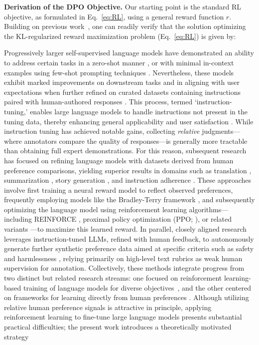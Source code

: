 \textbf{Derivation of the DPO Objective.} Our starting point is the standard RL objective, as formulated in Eq.~\ref{eq:RL}, using a general reward function $r$. Building on previous work~\citep{peters2007reinforcement, peng2019advantage, korbak2022reinforcement, go2023aligning}, one can readily verify that the solution optimizing the KL-regularized reward maximization problem (Eq.~\ref{eq:RL}) is given by:

Progressively larger self-supervised language models have demonstrated an ability to address certain tasks in a zero-shot manner \citep{radford2019language}, or with minimal in-context examples using few-shot prompting techniques \citep{gpt3,megatron,chowdhery2022palm}. Nevertheless, these models exhibit marked improvements on downstream tasks and in aligning with user expectations when further refined on curated datasets containing instructions paired with human-authored responses \citep{mishra-etal-2022-cross,sanh2022multitask,chung2022scaling,thoppilan2022lamda}. This process, termed `instruction-tuning,' enables large language models to handle instructions not present in the tuning data, thereby enhancing general applicability and user satisfaction \citep{chung2022scaling}. While instruction tuning has achieved notable gains, collecting \textit{relative} judgments—where annotators compare the quality of responses—is generally more tractable than obtaining full expert demonstrations. For this reason, subsequent research has focused on refining language models with datasets derived from human preference comparisons, yielding superior results in domains such as translation \citep{kreutzer-etal-2018-reliability}, summarization \citep{stiennon2022learning,ziegler2020finetuning}, story generation \citep{ziegler2020finetuning}, and instruction adherence \citep{ouyang2022training,ramamurthy2023is}. These approaches involve first training a neural reward model to reflect observed preferences, frequently employing models like the Bradley-Terry framework \citep{bradley1952rankanalysis}, and subsequently optimizing the language model using reinforcement learning algorithms—including REINFORCE \citep{williams1992reinforce}, proximal policy optimization (PPO; \cite{schulman2017proximal}), or related variants \citep{ramamurthy2023is}—to maximize this learned reward. In parallel, closely aligned research leverages instruction-tuned LLMs, refined with human feedback, to autonomously generate further synthetic preference data aimed at specific criteria such as safety and harmlessness \citep{bai2022constitutional}, relying primarily on high-level text rubrics as weak human supervision for annotation. Collectively, these methods integrate progress from two distinct but related research streams: one focused on reinforcement learning-based training of language models for diverse objectives~\citep{Ranzato2015SequenceLT,paulus2018a,wu2018learning}, and the other centered on frameworks for learning directly from human preferences \citep{christiano2017deep,kupcsik2018learning}. Although utilizing relative human preference signals is attractive in principle, applying reinforcement learning to fine-tune large language models presents substantial practical difficulties; the present work introduces a theoretically motivated strategy 